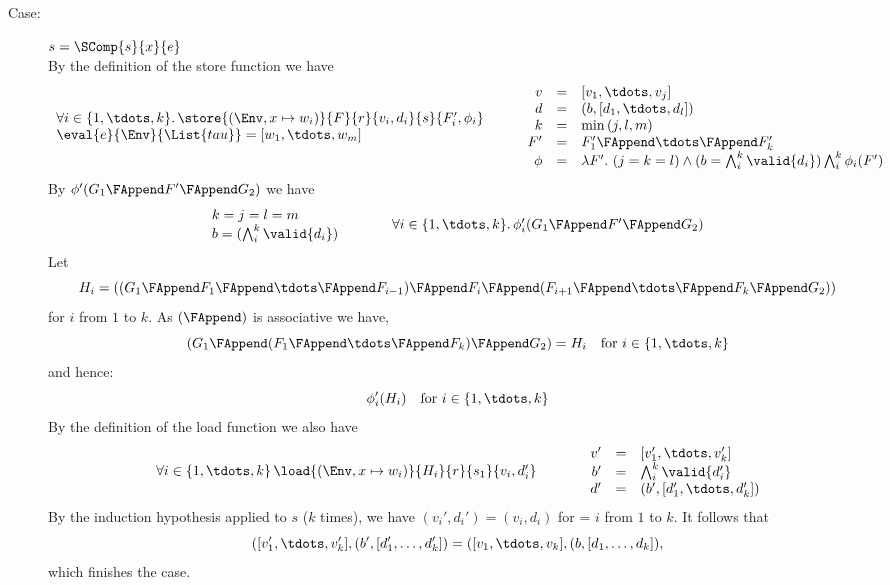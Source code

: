 {\begin{description}
\item[Case:] $s = \SComp{s}{x}{e}$\\[1ex]
By the definition of the store function we have
\[
\begin{array}{l}
\forall i \in \{1,\tdots,k\}.\,\store{(\Env, x \mapsto w_i)}{F}{r}{v_i,d_i}{s}{F_i',\phi_i}\\
\eval{e}{\Env}{\List{tau}} = [w_1,\tdots,w_m ]\\
\end{array}\hspace*{.75cm}\begin{array}{rcl}
v &=& [v_1,\tdots,v_j]\\
d &=& (b,[d_1,\tdots,d_l])\\
k &=& \min{(j,l,m)}\\
F' &=& F_1' \FAppend \tdots \FAppend F_k'\\
\phi &=& \lambda F'.~(j = k = l) \wedge (b = \bigwedge_i^k \valid{d_i}) \bigwedge_i^k \phi_i(F')\\
\end{array}
\]
By $\phi'(G_1 \FAppend F' \FAppend G_2)$ we have
\[
\begin{array}{l}
k = j = l = m\\
b = (\bigwedge_i^k \valid{d_i})\\
\end{array}\hspace*{1cm}\begin{array}{l}
\forall i \in \{1,\tdots,k\}.\,\phi_i'(G_1 \FAppend F' \FAppend G_2) \\
\end{array}
\]
%
Let
\[
H_i = ((G_1\FAppend F_1\FAppend \tdots \FAppend F_{i-1}) \FAppend F_i \FAppend (F_{i+1} \FAppend \tdots \FAppend F_k \FAppend G_2))
\]
for $i$ from $1$ to $k$. As $(\FAppend)$ is associative we have,
\[
(G_1\FAppend (F_1\FAppend \tdots \FAppend F_k)\FAppend G_2) = H_i \quad \text{for}~i \in \{1,\tdots,k\}
\]
and hence:
\[
\phi_i'(H_i) \quad \text{for}~i \in \{1,\tdots,k\}
\]
%
By the definition of the load function we also have 
\[ 
\begin{array}{l}
\forall i \in \{1,\tdots,k\}\,\load{(\Env, x \mapsto w_i)}{H_i}{r}{s_1}{v_i,d_i'}\\
\end{array}\hspace*{1cm}\begin{array}{rcl}
v' &=& [v_1',\tdots,v_k']\\
b' &=& \bigwedge_i^k \valid{d_i'}\\
d' &=& (b',[d_1',\tdots,d_k'])\\
\end{array}
\]
%
By the induction hypothesis applied to $s$ ($k$ times), we have
$(v_i',d_i') = (v_i,d_i)$ for = $i$ from $1$ to $k$. It follows that
%
\[
([v_1',\tdots,v_k'],(b',[d_1',\dots,d_k']) = 
([v_1,\tdots,v_k],(b,[d_1,\dots,d_k]),
\]
%
which finishes the case.


\end{description}}
